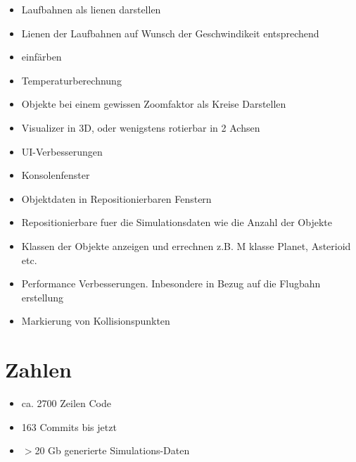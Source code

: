 \begin{itemize}
    \item Laufbahnen als lienen darstellen
    \item Lienen der Laufbahnen auf Wunsch der Geschwindikeit entsprechend
    \item einfärben
    \item Temperaturberechnung
    \item Objekte bei einem gewissen Zoomfaktor als Kreise Darstellen
    \item Visualizer in 3D, oder wenigstens rotierbar in 2 Achsen
    \item UI-Verbesserungen
    \item Konsolenfenster
    \item Objektdaten in Repositionierbaren Fenstern
    \item Repositionierbare fuer die Simulationsdaten wie die Anzahl der Objekte
    \item Klassen der Objekte anzeigen und errechnen z.B. M klasse Planet, Asterioid etc.
    \item Performance Verbesserungen. Inbesondere in Bezug auf die Flugbahn erstellung
    \item Markierung von Kollisionspunkten


\end{itemize}

\section{Zahlen}
\begin{itemize}
    \item ca. 2700 Zeilen Code
    \item 163 Commits bis jetzt
    \item $>$20 Gb generierte Simulations-Daten
\end{itemize}

